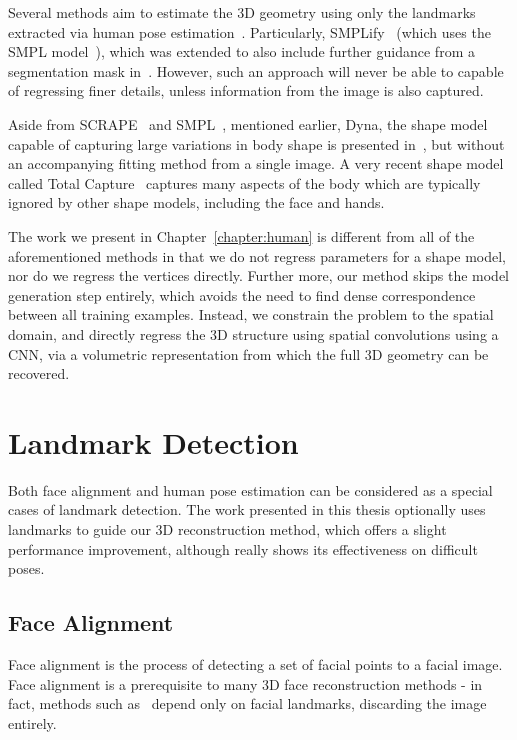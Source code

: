 Several methods aim to estimate the 3D geometry using only the
landmarks extracted via human pose
estimation~\cite{bogo2016smplify,ramakrishna2012reconstructing}. Particularly,
SMPLify~\cite{bogo2016smplify} (which uses the SMPL
model~\cite{loper2015smpl}), which was extended to also include
further guidance from a segmentation mask
in~\cite{varol2017learning}. However, such an approach will never be
able to capable of regressing finer details, unless information from
the image is also captured.

Aside from SCRAPE~\cite{anguelov2005scape} and
SMPL~\cite{loper2015smpl}, mentioned earlier, Dyna, the shape model
capable of capturing large variations in body shape is presented
in~\cite{Dyna:SIGGRAPH:2015}, but without an accompanying fitting
method from a single image. A very recent shape model called Total
Capture~\cite{Joo_2018_CVPR} captures many aspects of the body which
are typically ignored by other shape models, including the face and
hands.

The work we present in Chapter~\ref{chapter:human} is different from
all of the aforementioned methods in that we do not regress parameters
for a shape model, nor do we regress the vertices directly. Further
more, our method skips the model generation step entirely, which
avoids the need to find dense correspondence between all training
examples. Instead, we constrain the problem to the spatial domain, and
directly regress the 3D structure using spatial convolutions using a
CNN, via a volumetric representation from which the full 3D geometry
can be recovered.

\section{Landmark Detection}

Both face alignment and human pose estimation can be considered
as a special cases of landmark detection. The work presented in this thesis
optionally uses landmarks to guide our 3D reconstruction method, which
offers a slight performance improvement, although really shows its
effectiveness on difficult poses.

\subsection{Face Alignment}

Face alignment is the process of detecting a set of facial points to a
facial image. Face alignment is a prerequisite to many 3D face
reconstruction methods - in fact, methods such
as~\cite{huber2016multiresolution} depend only on facial landmarks,
discarding the image entirely.


